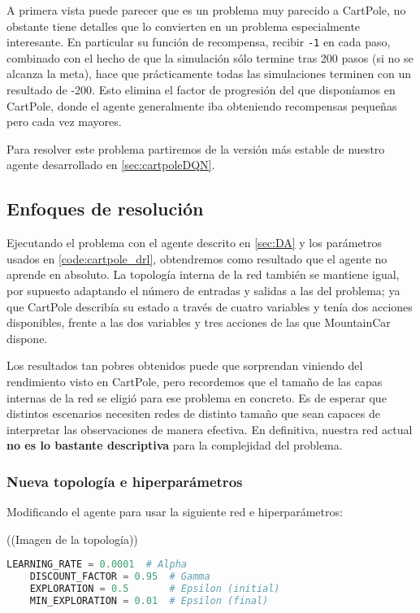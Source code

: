 A primera vista puede parecer que es un problema muy parecido a CartPole, no obstante tiene detalles que lo convierten en un problema especialmente interesante. En particular su función de recompensa, recibir \texttt{-1} en cada paso, combinado con el hecho de que la simulación sólo termine tras 200 pasos (si no se alcanza la meta), hace que prácticamente todas las simulaciones terminen con un resultado de -200. Esto elimina el factor de progresión del que disponíamos en CartPole, donde el agente generalmente iba obteniendo recompensas pequeñas pero cada vez mayores.

Para resolver este problema partiremos de la versión más estable de nuestro agente desarrollado en \ref{sec:cartpoleDQN}.


\subsection{Enfoques de resolución}

Ejecutando el problema con el agente descrito en \ref{sec:DA} y los parámetros usados en \ref{code:cartpole_drl}, obtendremos como resultado que el agente no aprende en absoluto. La topología interna de la red también se mantiene igual, por supuesto adaptando el número de entradas y salidas a las del problema; ya que CartPole describía su estado a través de cuatro variables y tenía dos acciones disponibles, frente a las dos variables y tres acciones de las que MountainCar dispone.

Los resultados tan pobres obtenidos puede que sorprendan viniendo del rendimiento visto en CartPole, pero recordemos que el tamaño de las capas internas de la red se eligió para ese problema en concreto. Es de esperar que distintos escenarios necesiten redes de distinto tamaño que sean capaces de interpretar las observaciones de manera efectiva. En definitiva, nuestra red actual \textbf{no es lo bastante descriptiva} para la complejidad del problema.


\subsubsection{Nueva topología e hiperparámetros}

Modificando el agente para usar la siguiente red e hiperparámetros:

((Imagen de la topología))

\begin{minipage}{0.9\linewidth}%
    \begin{lstlisting}[frame=tb, language=Python, caption=Hiperparámetros MountainCar, label=code:cartpole_drl]
    LEARNING_RATE = 0.0001  # Alpha
    DISCOUNT_FACTOR = 0.95  # Gamma
    EXPLORATION = 0.5       # Epsilon (initial)
    MIN_EXPLORATION = 0.01  # Epsilon (final)
    \end{lstlisting}%
\end{minipage}

